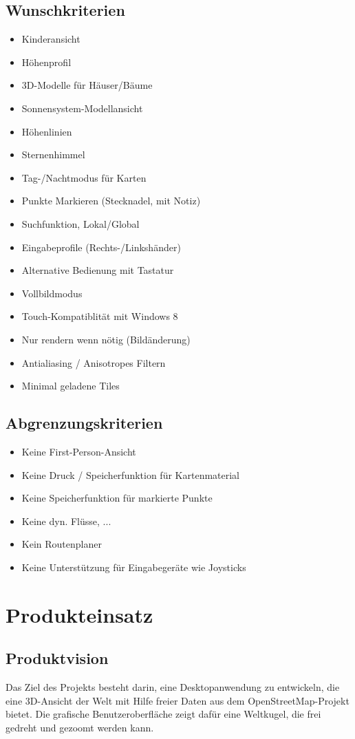 \documentclass[10pt]{scrreprt}
\begin{document}
\section{Wunschkriterien}
\begin{itemize}
\item Kinderansicht
\item Höhenprofil
\item 3D-Modelle für Häuser/Bäume
\item Sonnensystem-Modellansicht
\item Höhenlinien
\item Sternenhimmel
\item Tag-/Nachtmodus für Karten
\item Punkte Markieren (Stecknadel, mit Notiz)
\item Suchfunktion, Lokal/Global
\item Eingabeprofile (Rechts-/Linkshänder)
\item Alternative Bedienung mit Tastatur
\item Vollbildmodus
\item Touch-Kompatiblität mit Windows 8
\item Nur rendern wenn nötig (Bildänderung)
\item Antialiasing / Anisotropes Filtern
\item Minimal geladene Tiles
\end{itemize}
\section{Abgrenzungskriterien}
\begin{itemize}
\item Keine First-Person-Ansicht
\item Keine Druck / Speicherfunktion für Kartenmaterial
\item Keine Speicherfunktion für markierte Punkte
\item Keine dyn. Flüsse, ...
\item Kein Routenplaner
\item Keine Unterstützung für Eingabegeräte wie Joysticks
\end{itemize}





\chapter{Produkteinsatz}
\section{Produktvision}
Das Ziel des Projekts besteht darin, eine Desktopanwendung zu entwickeln, die eine 3D-Ansicht der Welt mit Hilfe freier Daten aus dem OpenStreetMap-Projekt bietet. Die grafische Benutzeroberfläche zeigt dafür eine Weltkugel, die frei gedreht und gezoomt werden kann. 
\end{document}
